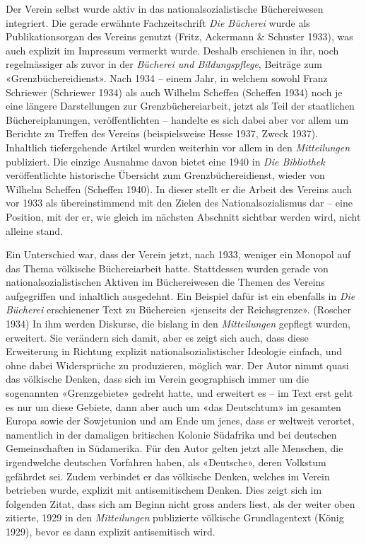 \documentclass[a4paper,
fontsize=11pt,
oneside,
numbers=noperiodatend,
parskip=half-,
bibliography=totoc,
final
]{scrartcl}
\begin{document}
Der Verein selbst wurde aktiv in das nationalsozialistische
Büchereiwesen integriert. Die gerade erwähnte Fachzeitschrift \emph{Die
Bücherei} wurde als Publikationsorgan des Vereins genutzt (Fritz,
Ackermann \& Schuster 1933), was auch explizit im Impressum vermerkt
wurde. Deshalb erschienen in ihr, noch regelmässiger als zuvor in der
\emph{Bücherei und Bildungspflege}, Beiträge zum «Grenzbüchereidienst».
Nach 1934 -- einem Jahr, in welchem sowohl Franz Schriewer (Schriewer
1934) als auch Wilhelm Scheffen (Scheffen 1934) noch je eine längere
Darstellungen zur Grenzbüchereiarbeit, jetzt als Teil der staatlichen
Büchereiplanungen, veröffentlichten -- handelte es sich dabei aber vor
allem um Berichte zu Treffen des Vereins (beispielsweise Hesse 1937,
Zweck 1937). Inhaltlich tiefergehende Artikel wurden weiterhin vor allem
in den \emph{Mitteilungen} publiziert. Die einzige Ausnahme davon bietet
eine 1940 in \emph{Die Bibliothek} veröffentlichte historische Übersicht
zum Grenzbüchereidienst, wieder von Wilhelm Scheffen (Scheffen 1940). In
dieser stellt er die Arbeit des Vereins auch vor 1933 als
übereinstimmend mit den Zielen des Nationalsozialismus dar -- eine
Position, mit der er, wie gleich im nächsten Abschnitt sichtbar werden
wird, nicht alleine stand.

Ein Unterschied war, dass der Verein jetzt, nach 1933, weniger ein
Monopol auf das Thema völkische Büchereiarbeit hatte. Stattdessen wurden
gerade von nationalsozialistischen Aktiven im Büchereiwesen die Themen
des Vereins aufgegriffen und inhaltlich ausgedehnt. Ein Beispiel dafür
ist ein ebenfalls in \emph{Die Bücherei} erschienener Text zu Büchereien
«jenseits der Reichsgrenze». (Roscher 1934) In ihm werden Diskurse, die
bislang in den \emph{Mitteilungen} gepflegt wurden, erweitert. Sie
verändern sich damit, aber es zeigt sich auch, dass diese Erweiterung in
Richtung explizit nationalsozialistischer Ideologie einfach, und ohne
dabei Widersprüche zu produzieren, möglich war. Der Autor nimmt quasi
das völkische Denken, dass sich im Verein geographisch immer um die
sogenannten «Grenzgebiete» gedreht hatte, und erweitert es -- im Text
erst geht es nur um diese Gebiete, dann aber auch um «das Deutschtum» im
gesamten Europa sowie der Sowjetunion und am Ende um jenes, dass er
weltweit verortet, namentlich in der damaligen britischen Kolonie
Südafrika und bei deutschen Gemeinschaften in Südamerika. Für den Autor
gelten jetzt alle Menschen, die irgendwelche deutschen Vorfahren haben,
als «Deutsche», deren Volkstum gefährdet sei. Zudem verbindet er das
völkische Denken, welches im Verein betrieben wurde, explizit mit
antisemitischem Denken. Dies zeigt sich im folgenden Zitat, dass sich am
Beginn nicht gross anders liest, als der weiter oben zitierte, 1929 in
den \emph{Mitteilungen} publizierte völkische Grundlagentext (König
1929), bevor es dann explizit antisemitisch wird.
\end{document}
